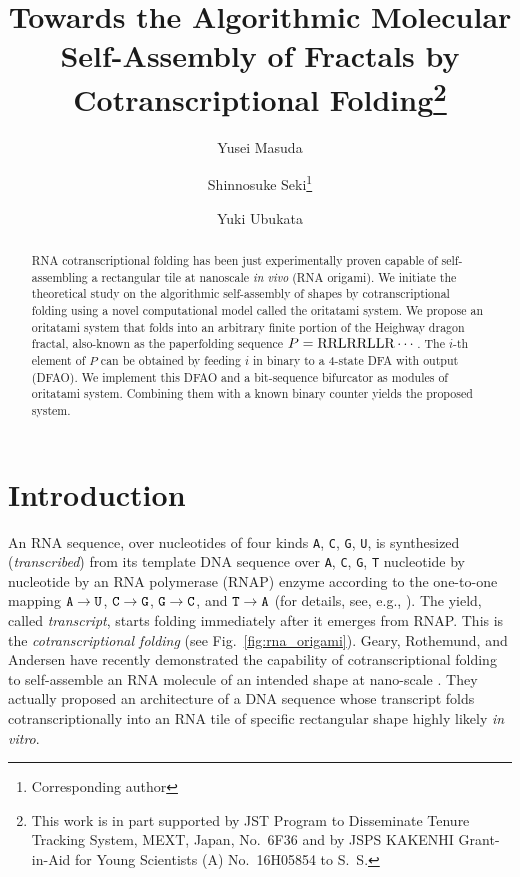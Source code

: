 \documentclass[runningheads]{llncs}
\title{Towards the Algorithmic Molecular Self-Assembly of Fractals by Cotranscriptional Folding\thanks{This work is in part supported by JST Program to Disseminate Tenure Tracking System, MEXT, Japan, No.~6F36 and by JSPS KAKENHI Grant-in-Aid for Young Scientists (A) No.~16H05854 to S.~S.
}}
\author{
Yusei Masuda \and 
Shinnosuke Seki\thanks{Corresponding author} \and 
Yuki Ubukata
}
\institute{
Department of Computer and Network Engineering, 
The University of Electro-Communications, 
1-5-1, Chofugaoka, Chofu, Tokyo, 1828585, Japan 
\email{s.seki@uec.ac.jp}
}
\begin{document}
\maketitle

\begin{abstract}
RNA cotranscriptional folding has been just experimentally proven capable of self-assembling a rectangular tile at nanoscale {\it in vivo} (RNA origami). 
We initiate the theoretical study on the algorithmic self-assembly of shapes by cotranscriptional folding using a novel computational model called the oritatami system. 
We propose an oritatami system that folds into an arbitrary finite portion of the Heighway dragon fractal, also-known as the paperfolding sequence $P = {\rm RRLRRLLR} \cdots$. 
The $i$-th element of $P$ can be obtained by feeding $i$ in binary to a 4-state DFA with output (DFAO). 
We implement this DFAO and a bit-sequence bifurcator as modules of oritatami system. 
Combining them with a known binary counter yields the proposed system. 
\end{abstract}

	\section{Introduction}

An RNA sequence, over nucleotides of four kinds {\tt A}, {\tt C}, {\tt G}, {\tt U}, is synthesized (\textit{transcribed}) from its template DNA sequence over {\tt A}, {\tt C}, {\tt G}, {\tt T} nucleotide by nucleotide by an RNA polymerase (RNAP) enzyme according to the one-to-one mapping ${\tt A} \to {\tt U}$, ${\tt C} \to {\tt G}$, ${\tt G} \to {\tt C}$, and ${\tt T} \to {\tt A}$ (for details, see, e.g., \cite{AJLMRRW2014}). 
The yield, called \textit{transcript}, starts folding immediately after it emerges from RNAP. 
This is the \textit{cotranscriptional folding} (see Fig.~\ref{fig:rna_origami}). 
Geary, Rothemund, and Andersen have recently demonstrated the capability of cotranscriptional folding to self-assemble an RNA molecule of an intended shape at nano-scale \cite{GearyRothemundAndersen2014}. 
They actually proposed an architecture of a DNA sequence whose transcript folds cotranscriptionally into an RNA tile of specific rectangular shape highly likely \textit{in vitro}. 
\end{document}
